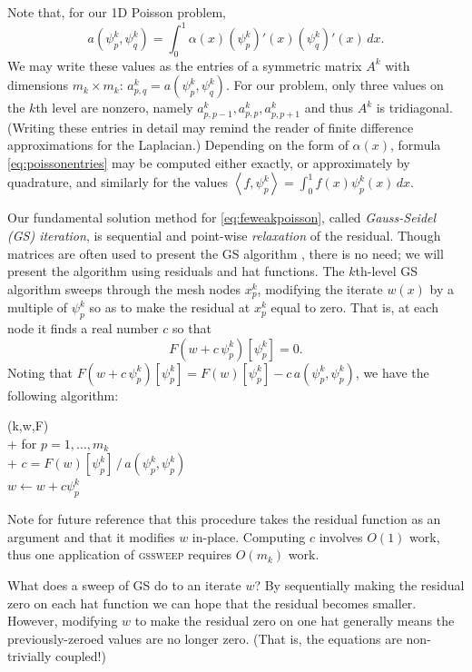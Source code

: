 \documentclass[letterpaper,final,12pt,reqno]{amsart}
\newcommand{\ip}[2]{\left<#1,#2\right>}
\numberwithin{equation}{section}
\numberwithin{figure}{section}
\numberwithin{table}{section}
\begin{document}
Note that, for our 1D Poisson problem,
\begin{equation}
  a(\psi_p^k,\psi_q^k) = \int_0^1 \alpha(x) (\psi_p^k)'(x) (\psi_q^k)'(x)\,dx. \label{eq:poissonentries}
\end{equation}
We may write these values as the entries of a symmetric matrix $A^k$ with dimensions $m_k\times m_k$: $a_{p,q}^k = a(\psi_p^k,\psi_q^k)$.  For our problem, only three values on the $k$th level are nonzero, namely $a_{p,p-1}^k, a_{p,p}^k, a_{p,p+1}^k$ and thus $A^k$ is tridiagonal.  (Writing these entries in detail may remind the reader of finite difference approximations for the Laplacian.)  Depending on the form of $\alpha(x)$, formula \eqref{eq:poissonentries} may be computed either exactly, or approximately by quadrature, and similarly for the values $\ip{f}{\psi_p^k} = \int_0^1 f(x) \psi_p^k(x)\,dx$.

Our fundamental solution method for \eqref{eq:feweakpoisson}, called \emph{Gauss-Seidel (GS) iteration}, is sequential and point-wise \emph{relaxation} of the residual.  Though matrices are often used to present the GS algorithm \cite[for example]{Bueler2021,Greenbaum1997}, there is no need; we will present the algorithm using residuals and hat functions.  The $k$th-level GS algorithm sweeps through the mesh nodes $x_p^k$, modifying the iterate $w(x)$ by a multiple of $\psi_p^k$ so as to make the residual at $x_p^k$ equal to zero.  That is, at each node it finds a real number $c$ so that
\begin{equation}
  F(w+c\,\psi_p^k)[\psi_p^k] = 0.  \label{eq:gaussseidelpoint}
\end{equation}
Noting that $F(w+c\,\psi_p^k)[\psi_p^k] = F(w)[\psi_p^k] - c\, a(\psi_p^k,\psi_p^k)$, we have the following algorithm:
\begin{pseudo*}
(k,w,F)\text{:} \\+
    for $p=1,\dots,m_k$ \\+
        $\displaystyle c = F(w)[\psi_p^k]\, \big/ \,a(\psi_p^k,\psi_p^k)$  \\
        $w \gets w + c \psi_p^k$
\end{pseudo*}
Note for future reference that this procedure takes the residual function as an argument and that it modifies $w$ in-place.  Computing $c$ involves $O(1)$ work, thus one application of \textsc{gssweep} requires $O(m_k)$ work.

What does a sweep of GS do to an iterate $w$?  By sequentially making the residual zero on each hat function we can hope that the residual becomes smaller.  However, modifying $w$ to make the residual zero on one hat generally means the previously-zeroed values are no longer zero.  (That is, the equations are non-trivially coupled!)
\end{document}
